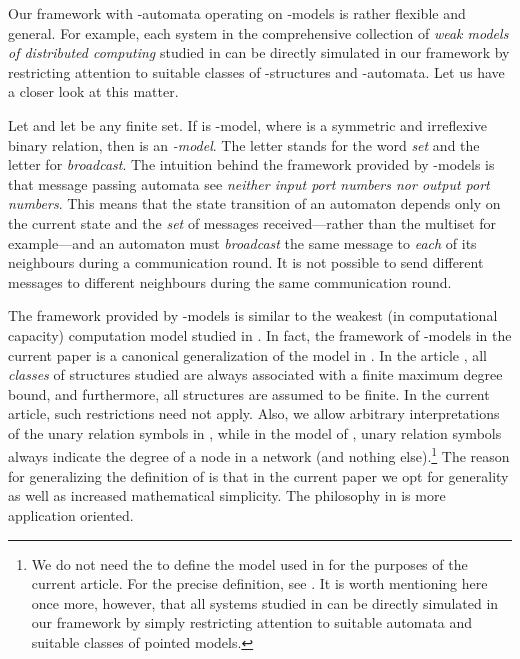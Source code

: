 \documentclass[copyright,creativecommons]{eptcs}
\begin{document}
Our framework with -automata
operating on -models is rather flexible
and general. For example, each system in 
the comprehensive collection of
\emph{weak models of distributed computing}
studied in \cite{hella, hella2} can be directly
simulated in our framework by restricting attention to suitable
classes of -structures and -automata.
Let us have a closer look at this matter.








Let  and let  be any finite set.
If  is -model, where  is a symmetric and irreflexive binary relation, then
 is an \emph{-model}. The letter  stands
for the word \emph{set} and the letter  for \emph{broadcast}.
The intuition behind the framework provided by -models is that
message passing automata see \emph{neither input port numbers nor output port numbers}.
This means that the state transition of an automaton depends only on the
current state and the \emph{set} of messages received---rather than
the multiset for example---and an
automaton must \emph{broadcast} the same message to \emph{each} of its
neighbours during a communication round.
It is not possible to send different messages to different neighbours during the
same communication round.




The framework provided by -models is similar to
the weakest (in computational capacity) computation model  studied in \cite{hella, hella2}.
In fact, the framework of -models in the current paper is a canonical
generalization of the model  in \cite{hella, hella2}.
In the article \cite{hella, hella2}, all \emph{classes} of structures
studied are always associated with a finite maximum degree bound,
and furthermore, all structures are assumed to be finite.
In the current article, such restrictions need not apply.
Also, we allow arbitrary interpretations of the unary relation symbols in ,
while in the  model of \cite{hella, hella2}, unary relation symbols
always indicate the degree of a node in a network (and nothing else).\hspace{0.4mm}\footnote{We 
do not need the to define the  model
used in \cite{hella, hella2} for the purposes of the current article.
For the precise definition, see \cite{hella, hella2}. It is worth mentioning here once more, however,  
that all systems studied in \cite{hella, hella2} can be directly simulated in our framework
by simply restricting attention to suitable automata and suitable classes of pointed models.}
The reason for generalizing the definition of \cite{hella, hella2} is that in the current paper
we opt for generality as well as increased mathematical simplicity.
The philosophy in \cite{hella, hella2} is more application oriented.
\end{document}

